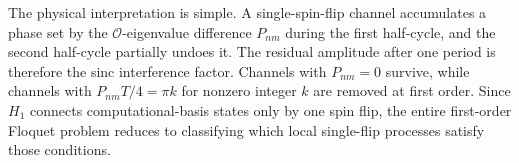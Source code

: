 \documentclass[aps,prb,reprint,twocolumn,amsmath,amssymb,citeautoscript]{revtex4-2}
\begin{document}
The physical interpretation is simple. A single-spin-flip channel
accumulates a phase set by the $\mathcal{O}$-eigenvalue difference
$P_{nm}$ during the first half-cycle, and the second half-cycle partially
undoes it. The residual amplitude after one period is therefore the sinc
interference factor. Channels with $P_{nm}=0$ survive, while channels
with $P_{nm}T/4=\pi k$ for nonzero integer $k$ are removed at first
order. Since $H_1$ connects computational-basis states only by one spin
flip, the entire first-order Floquet problem reduces to classifying which
local single-flip processes satisfy those conditions.

\end{document}
